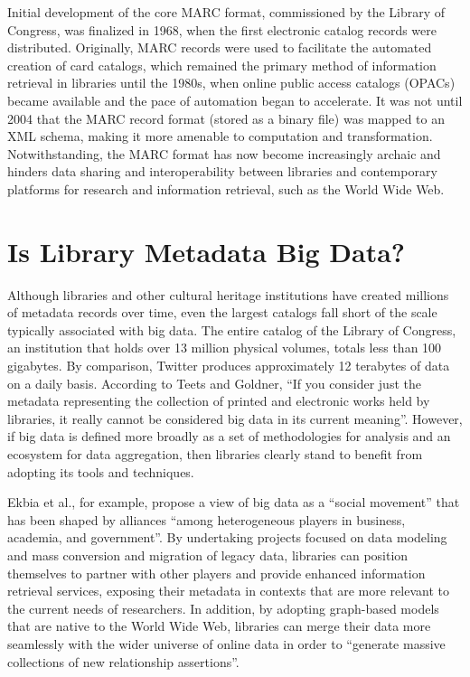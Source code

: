 \documentclass[sigconf]{acmart}
\begin{document}
Initial development of the core MARC format, commissioned by the Library of Congress, was finalized in 1968, when the first electronic catalog records were distributed\cite{kF12}. Originally, MARC records were used to facilitate the automated creation of card catalogs, which remained the primary method of information retrieval in libraries until the 1980s, when online public access catalogs (OPACs) became available and the pace of automation began to accelerate\cite{mT13}. It was not until 2004 that the MARC record format (stored as a binary file) was mapped to an XML schema, making it more amenable to computation and transformation. Notwithstanding, the MARC format has now become increasingly archaic and hinders data sharing and interoperability between libraries and contemporary platforms for research and information retrieval, such as the World Wide Web.

\section{Is Library Metadata Big Data?}
Although libraries and other cultural heritage institutions have created millions of metadata records over time, even the largest catalogs fall short of the scale typically associated with big data. The entire catalog of the Library of Congress, an institution that holds over 13 million physical volumes, totals less than 100 gigabytes. By comparison, Twitter produces approximately 12 terabytes of data on a daily basis\cite[p.~1527]{hE15}. According to Teets and Goldner, ``If you consider just the metadata representing the collection of printed and electronic works held by libraries, it really cannot be considered big data in its current meaning''\cite{mT13}. However, if big data is defined more broadly as a set of methodologies for analysis and an ecosystem for data aggregation, then libraries clearly stand to benefit from adopting its tools and techniques. 

Ekbia et al., for example, propose a view of big data as a ``social movement'' that has been shaped by alliances ``among heterogeneous players in business, academia, and government''\cite[p.~1527]{hE15}. By undertaking projects focused on data modeling and mass conversion and migration of legacy data, libraries can position themselves to partner with other players and provide enhanced information retrieval services, exposing their metadata in contexts that are more relevant to the current needs of researchers. In addition, by adopting graph-based models that are native to the World Wide Web, libraries can merge their data more seamlessly with the wider universe of online data in order to ``generate massive collections of new relationship assertions''\cite{mT13}. 
\end{document}
